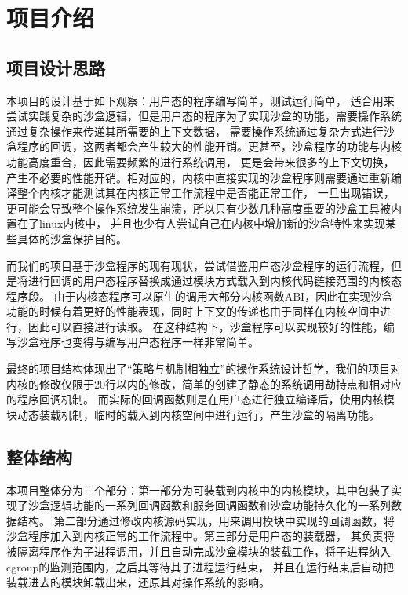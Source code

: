 \documentclass[AutoFakeBold,a4paper]{ctexart}
\begin{document}
\section{项目介绍}

\subsection{项目设计思路}
本项目的设计基于如下观察：用户态的程序编写简单，测试运行简单，
适合用来尝试实践复杂的沙盒逻辑，但是用户态的程序为了实现沙盒的功能，需要操作系统通过复杂操作来传递其所需要的上下文数据，
需要操作系统通过复杂方式进行沙盒程序的回调，这两者都会产生较大的性能开销。更甚至，沙盒程序的功能与内核功能高度重合，因此需要频繁的进行系统调用，
更是会带来很多的上下文切换，产生不必要的性能开销。相对应的，内核中直接实现的沙盒程序则需要通过重新编译整个内核才能测试其在内核正常工作流程中是否能正常工作，
一旦出现错误，更可能会导致整个操作系统发生崩溃，所以只有少数几种高度重要的沙盒工具被内置在了linux内核中，
并且也少有人尝试自己在内核中增加新的沙盒特性来实现某些具体的沙盒保护目的。

而我们的项目基于沙盒程序的现有现状，尝试借鉴用户态沙盒程序的运行流程，但是将进行回调的用户态程序替换成通过模块方式载入到内核代码链接范围的内核态程序段。
由于内核态程序可以原生的调用大部分内核函数ABI，因此在实现沙盒功能的时候有着更好的性能表现，同时上下文的传递也由于同样在内核空间中进行，因此可以直接进行读取。
在这种结构下，沙盒程序可以实现较好的性能，编写沙盒程序也变得与编写用户态程序一样非常简单。

最终的项目结构体现出了“策略与机制相独立”的操作系统设计哲学，我们的项目对内核的修改仅限于20行以内的修改，简单的创建了静态的系统调用劫持点和相对应的程序回调机制。
而实际的回调函数则是在用户态进行独立编译后，使用内核模块动态装载机制，临时的载入到内核空间中进行运行，产生沙盒的隔离功能。

\subsection{整体结构}
本项目整体分为三个部分：第一部分为可装载到内核中的内核模块，其中包装了实现了沙盒逻辑功能的一系列回调函数和服务回调函数和沙盒功能持久化的一系列数据结构。
第二部分通过修改内核源码实现，用来调用模块中实现的回调函数，将沙盒程序加入到内核正常的工作流程中。第三部分是用户态的装载器，
其负责将被隔离程序作为子进程调用，并且自动完成沙盒模块的装载工作，将子进程纳入cgroup的监测范围内，之后其等待其子进程运行结束，
并且在运行结束后自动把装载进去的模块卸载出来，还原其对操作系统的影响。
\end{document}
